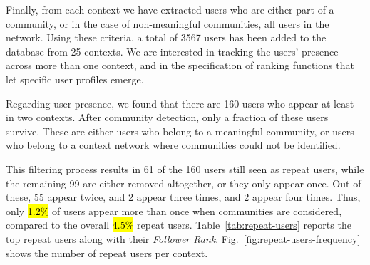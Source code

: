 \documentclass[runningheads]{llncs}
\begin{document}
Finally, from each context we have extracted users who are either part of a community, or in the case of non-meaningful communities, all users in the network.
Using these criteria, a total of 3567 users has been added to the database from 25 contexts.
We are interested in tracking the users' presence across more than one context, and in the specification of ranking functions that let specific user profiles emerge.

Regarding user presence, we found that there are 160 users who appear at least in two contexts. 
After community detection, only a fraction of these users survive. 
These are either users who belong to a meaningful community, or users who belong to a context network where communities could not be identified.

This filtering process results in 61 of the 160 users still seen as repeat users, while the remaining 99 are either removed altogether, or they only appear once. 
Out of these, 55 appear twice, and 2 appear three times, and 2 appear four times. 
Thus, only \hl{1.2\%} of users appear more than once when communities are considered, compared to the overall \hl{4.5\%} repeat users.
%
Table~\ref{tab:repeat-users} reports the top repeat users along with their \textit{Follower Rank}.  
%
Fig.~\ref{fig:repeat-users-frequency} shows the number of repeat users per context. 
\end{document}

